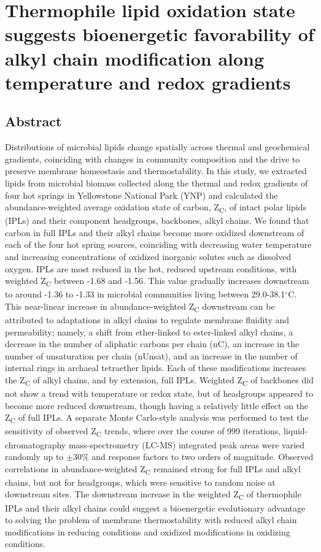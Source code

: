 \chapter{Thermophile lipid oxidation state suggests bioenergetic favorability of alkyl chain modification along temperature and redox gradients}\label{ch1}

\section{Abstract}
Distributions of microbial lipids change spatially across thermal and geochemical gradients, coinciding with changes in community composition and the drive to preserve membrane homeostasis and thermostability. In this study, we extracted lipids from microbial biomass collected along the thermal and redox gradients of four hot springs in Yellowstone National Park (YNP) and calculated the abundance-weighted average oxidation state of carbon, Z\textsubscript{C}, of intact polar lipids (IPLs) and their component headgroups, backbones, alkyl chains. We found that carbon in full IPLs and their alkyl chains become more oxidized downstream of each of the four hot spring sources, coinciding with decreasing water temperature and increasing concentrations of oxidized inorganic solutes such as dissolved oxygen. IPLs are most reduced in the hot, reduced upstream conditions, with weighted Z\textsubscript{C} between -1.68 and -1.56. This value gradually increases downstream to around -1.36 to -1.33 in microbial communities living between 29.0-38.1$^\circ$C. This near-linear increase in abundance-weighted Z\textsubscript{C} downstream can be attributed to adaptations in alkyl chains to regulate membrane fluidity and permeability; namely, a shift from ether-linked to ester-linked alkyl chains, a decrease in the number of aliphatic carbons per chain (nC), an increase in the number of unsaturation per chain (nUnsat), and an increase in the number of internal rings in archaeal tetraether lipids. Each of these modifications increases the Z\textsubscript{C} of alkyl chains, and by extension, full IPLs. Weighted Z\textsubscript{C} of backbones did not show a trend with temperature or redox state, but of headgroups appeared to become more reduced downstream, though having a relatively little effect on the Z\textsubscript{C} of full IPLs. A separate Monte Carlo-style analysis was performed to test the sensitivity of observed Z\textsubscript{C} trends, where over the course of 999 iterations, liquid-chromatography mass-spectrometry (LC-MS) integrated peak areas were varied randomly up to $\pm$30\% and response factors to two orders of magnitude. Observed correlations in abundance-weighted Z\textsubscript{C} remained strong for full IPLs and alkyl chains, but not for headgroups, which were sensitive to random noise at downstream sites. The downstream increase in the weighted Z\textsubscript{C} of thermophile IPLs and their alkyl chains could suggest a bioenergetic evolutionary advantage to solving the problem of membrane thermostability with reduced alkyl chain modifications in reducing conditions and oxidized modifications in oxidizing conditions.

